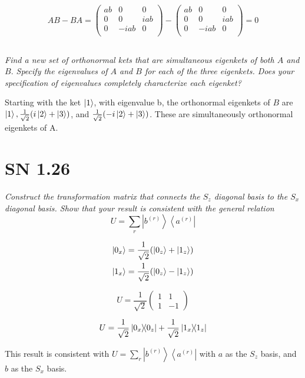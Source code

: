 \documentclass{article}
\begin{document}
$$ AB - BA = \left(\begin{array}{ccc}
     a b & 0 & 0 \\
     0 & 0 & i a b \\
     0 & -i a b & 0 \\
    \end{array}\right) - \left(\begin{array}{ccc}
     a b & 0 & 0 \\
     0 & 0 & i a b \\
     0 & -i a b & 0 \\
    \end{array}\right)  = 0$$

\subsection{}
\textit{Find a new set of orthonormal kets that are simultaneous eigenkets of both $A$ and $B .$ Specify the eigenvalues of $A$ and $B$ for each of the three eigenkets. Does your specification of eigenvalues completely characterize each eigenket?}

Starting with the ket $\ket{1}$, with eigenvalue b, the orthonormal eigenkets of $B$ are $\ket{1}, \frac{1}{\sqrt{2}} (i \ket{2} + \ket{3})$, and $\frac{1}{\sqrt{2}} (-i \ket{2} + \ket{3})$. These are simultaneously orthonormal eigenkets of A. 

\newpage
\section{SN 1.26}
\textit{Construct the transformation matrix that connects the $S_{z}$ diagonal basis to the $S_{x}$ diagonal basis. Show that your result is consistent with the general relation
$$
U=\sum_{r}\left|b^{(r)}\right\rangle\left\langle a^{(r)}\right|
$$}

\begin{align*}
\ket{0_x} & = \frac{1}{\sqrt{2}}(\ket{0_z} + \ket{1_z})\\
\ket{1_x} & = \frac{1}{\sqrt{2}}(\ket{0_z} - \ket{1_z})\\
\end{align*}

$$ U = \frac{1}{\sqrt{2}} \left(\begin{array}{cc}
1 & 1 \\
1 & -1
\end{array}\right)$$


$$ U =  \frac{1}{\sqrt{2}}\ketbra{0_x}{0_z} + \frac{1}{\sqrt{2}}\ketbra{1_x}{1_z}$$

This result is consistent with $U=\sum_{r}\left|b^{(r)}\right\rangle\left\langle a^{(r)}\right|$ with $a$ as the $S_z$ basis, and $b$ as the $S_x$ basis.
\end{document}
